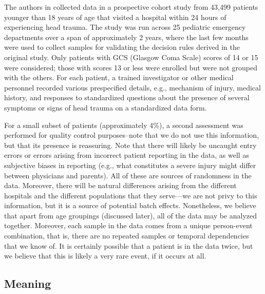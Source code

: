 \documentclass[11pt, letterpaper]{amsart}
\let\Oldsubsection\subsection
\renewcommand{\subsection}{\FloatBarrier\Oldsubsection}
\begin{document}
The authors in \cite{kuppermann2009identification} collected data in a prospective cohort study from 43,499 patients younger than 18 years of age that visited a hospital within 24 hours of experiencing head trauma. The study was run across 25 pediatric emergency departments over a span of approximately 2 years, where the last few months were used to collect samples for validating the decision rules derived in the original study. Only patients with GCS (Glasgow Coma Scale) scores of 14 or 15 were considered; those with scores 13 or less were enrolled but were not grouped with the others. For each patient, a trained investigator or other medical personnel recorded various prespecified details, e.g., mechanism of injury, medical history, and responses to standardized questions about the presence of several symptoms or signs of head trauma on a standardized data form. 

For a small subset of patients (approximately 4\%), a second assessment was performed for quality control purposes--note that we do not use this information, but that its presence is reassuring. Note that there will likely be uncaught entry errors or errors arising from incorrect patient reporting in the data, as well as subjective biases in reporting (e.g., what constitutes a severe injury might differ between physicians and parents). All of these are sources of randomness in the data. Moreover, there will be natural differences arising from the different hospitals and the different populations that they serve---we are not privy to this information, but it is a source of potential batch effects. Nonetheless, we believe that apart from age groupings (discussed later), all of the data may be analyzed together. Moreover, each sample in the data comes from a unique person-event combination, that is, there are no repeated samples or temporal dependencies that we know of. It is certainly possible that a patient is in the data twice, but we believe that this is likely a very rare event, if it occurs at all. 

\subsection{Meaning}

\end{document}

